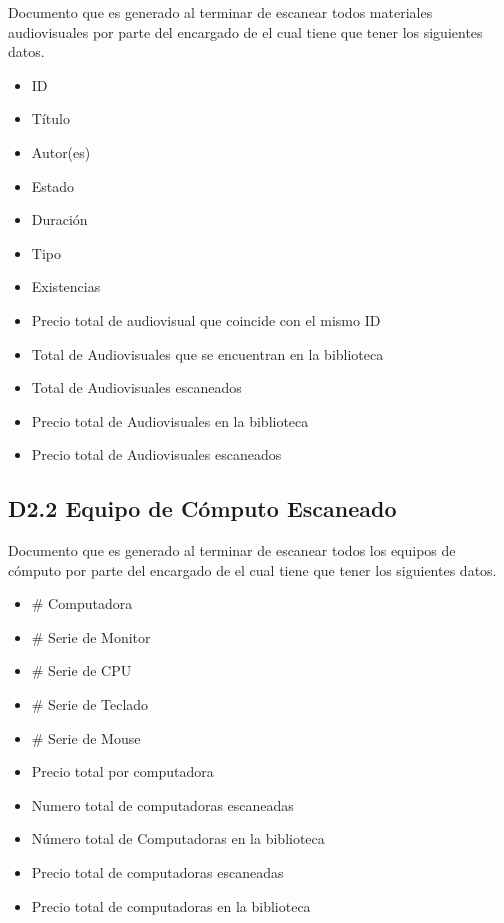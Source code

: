   Documento que es generado al terminar de escanear todos materiales audiovisuales por parte del encargado de   el cual tiene que tener los siguientes datos.
  
  \begin{itemize}
  \item ID 
  \item Título
  \item Autor(es)
  \item Estado
  \item Duración
  \item Tipo
  \item Existencias
  \item Precio total de audiovisual que coincide con el mismo ID
  \item Total de Audiovisuales que se encuentran en la biblioteca
  \item Total de Audiovisuales escaneados
  \item Precio total de Audiovisuales en la biblioteca
  \item Precio total de Audiovisuales escaneados
  \end{itemize}
  
 \subsection{D2.2 Equipo de Cómputo Escaneado}

  Documento que es generado al terminar de escanear todos los equipos de cómputo por parte del encargado de   el cual tiene que tener los siguientes datos.
  
  \begin{itemize}
  \item \# Computadora
  \item \# Serie de Monitor
  \item \# Serie de CPU
  \item \# Serie de Teclado
  \item \# Serie de Mouse
  \item Precio total por computadora
  \item Numero total de computadoras escaneadas
  \item Número total de Computadoras en la biblioteca
  \item Precio total de computadoras escaneadas
  \item Precio total de computadoras en la biblioteca 
  \end{itemize}
  

